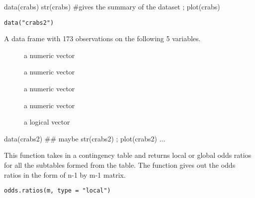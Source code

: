 \documentclass[letterpaper]{book}
\begin{document}
%
\begin{Examples}
\begin{ExampleCode}
data(crabs)
str(crabs) #gives the summary of the dataset ; 
plot(crabs) 
  
\end{ExampleCode}
\end{Examples}
%
\begin{Usage}
\begin{verbatim}
data("crabs2")
\end{verbatim}
\end{Usage}
%
\begin{Format}
A data frame with 173 observations on the following 5 variables.
\begin{description}

\item[] a numeric vector
\item[] a numeric vector
\item[] a numeric vector
\item[] a numeric vector
\item[] a logical vector

\end{description}

\end{Format}
%
\begin{Examples}
\begin{ExampleCode}
data(crabs2)
## maybe str(crabs2) ; plot(crabs2) ...
\end{ExampleCode}
\end{Examples}
%
\begin{Description}\relax
This function takes in a contingency table and returns local or global odds ratios for all the subtables formed from the table. 
The function gives out the odds ratios in the form of n-1 by m-1 matrix.
\end{Description}
%
\begin{Usage}
\begin{verbatim}
odds.ratios(m, type = "local")
\end{verbatim}
\end{Usage}
\end{document}
